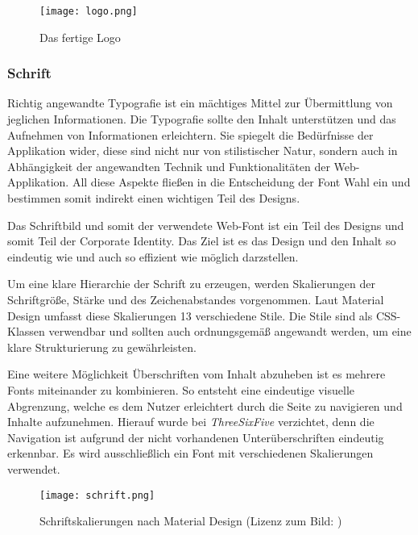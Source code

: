 

\begin{figure}[H] \centering \texttt{[image: logo.png]} \caption{Das fertige Logo} \end{figure}

\subsubsection{Schrift}

Richtig angewandte Typografie\cite{Schrift} ist ein mächtiges Mittel zur Übermittlung von jeglichen Informationen. Die Typografie sollte den Inhalt unterstützen und das Aufnehmen von Informationen erleichtern. Sie spiegelt die Bedürfnisse der Applikation wider, diese sind nicht nur von stilistischer Natur, sondern auch in Abhängigkeit der angewandten Technik und Funktionalitäten der Web-Applikation. All diese Aspekte fließen in die Entscheidung der Font Wahl ein und bestimmen somit indirekt einen wichtigen Teil des Designs.

Das Schriftbild und somit der verwendete Web-Font ist ein Teil des Designs und somit Teil der Corporate Identity. Das Ziel ist es das Design und den Inhalt so eindeutig wie und auch so effizient wie möglich darzstellen.

Um eine klare Hierarchie der Schrift zu erzeugen, werden Skalierungen\cite{Skalierung} der Schriftgröße, Stärke und des Zeichenabstandes vorgenommen. Laut Material Design umfasst diese Skalierungen 13 verschiedene Stile. Die Stile sind als CSS-Klassen verwendbar und sollten auch ordnungsgemäß angewandt werden, um eine klare Strukturierung zu gewährleisten.

Eine weitere Möglichkeit Überschriften vom Inhalt abzuheben ist es mehrere Fonts miteinander zu kombinieren. So entsteht eine eindeutige visuelle Abgrenzung, welche es dem Nutzer erleichtert durch die Seite zu navigieren und Inhalte aufzunehmen. Hierauf wurde bei \textit{ThreeSixFive} verzichtet, denn die Navigation ist aufgrund der nicht vorhandenen Unterüberschriften eindeutig erkennbar.  Es wird ausschließlich ein Font mit verschiedenen Skalierungen verwendet.

\begin{figure}[H] \centering \texttt{[image: schrift.png]} \caption{Schriftskalierungen nach Material Design (Lizenz zum Bild: \cite{SchriftskalierungenBild})} \end{figure}

